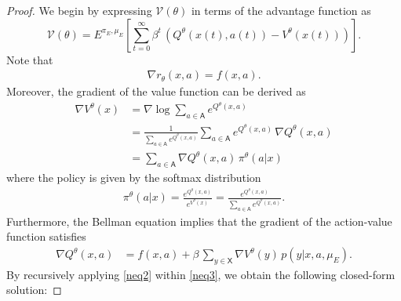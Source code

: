 \documentclass[11pt]{article}
\newcommand{\sX}{{\mathsf X}}
\newcommand{\sA}{{\mathsf A}}
\newcommand{\V}{{\mathcal V}}
\begin{document}
\begin{proof}
We begin by expressing $\V(\theta)$ in terms of the advantage function as 
$$
\V(\theta) = E^{\pi_E,\mu_E} \left[\sum_{t=0}^{\infty} \beta^t \, \left(Q^{\theta}(x(t),a(t))-V^{\theta}(x(t))\right) \right].
$$
Note that
\begin{align}
\nabla r_{\theta}(x,a) = f(x,a). \label{neq1} 
\end{align}
Moreover, the gradient of the value function can be derived as 
\begin{align}
\nabla V^{\theta}(x) &= \nabla \log \sum_{a \in \sA} e^{Q^{\theta}(x,a)} \nonumber \\
&= \frac{1}{\sum_{a \in \sA} e^{Q^{\theta}(x,a)}} \sum_{a \in \sA} e^{Q^{\theta}(x,a)} \, \nabla Q^{\theta}(x,a) \nonumber \\
&= \sum_{a \in \sA} \nabla Q^{\theta}(x,a) \, \pi^{\theta}(a|x) \label{neq2}
\end{align}
where the policy is given by the softmax distribution
\begin{align*}
\pi^{\theta}(a|x) = \frac{e^{Q^{\theta}(x,a)}}{e^{V^{\theta}(x)}} = \frac{e^{Q^{\theta}(x,a)}}{\sum_{a \in \sA} e^{Q^{\theta}(x,a)}}.
\end{align*}
Furthermore, the Bellman equation implies that the gradient of the action-value function satisfies 
\begin{align}
\nabla Q^{\theta}(x,a) &= f(x,a) + \beta \, \sum_{y \in \sX} \nabla V^{\theta}(y) \, p(y|x,a,\mu_E). \label{neq3}
\end{align}
By recursively applying \eqref{neq2} within \eqref{neq3}, we obtain the following closed-form solution:


\end{proof}
\end{document}
